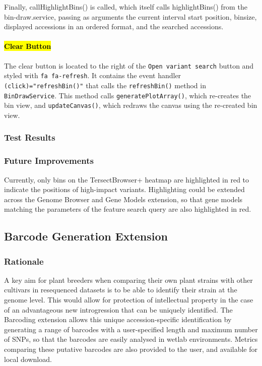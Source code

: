 \documentclass[12pt]{article}
\begin{document}
Finally, callHighlightBins() is called, which itself calls highlightBins() from the bin-draw.service, passing as arguments the current interval start position, binsize, displayed accessions in an ordered format, and the searched accessions.  

\paragraph{\hl{Clear Button }}
The clear button is located to the right of the \verb+Open variant search+ button and styled with \verb+fa fa-refresh+. It contains the event handler \verb+(click)="refreshBin()"+ that calls the \verb+refreshBin()+ method in \verb+BinDrawService+.
This method calls \verb+generatePlotArray()+, which re-creates the bin view, and \verb+updateCanvas()+, which redraws the canvas using the re-created bin view.
 

\subsubsection{Test Results}

\subsubsection{Future Improvements}
Currently, only bins on the TersectBrowser+ heatmap are highlighted in red to indicate the positions of high-impact variants. Highlighting could be extended across the Genome Browser and Gene Models extension, so that gene models matching the parameters of the feature search query are also highlighted in red.


\subsection{Barcode Generation Extension}
\subsubsection{Rationale}
A key aim for plant breeders when comparing their own plant strains with other cultivars in resequenced datasets is to be able to identify their strain at the genome level. This would allow for protection of intellectual property in the case of an advantageous new introgression that can be uniquely identified. The Barcoding extension allows this unique accession-specific identification by generating a range of barcodes with a user-specified length and maximum number of SNPs, so that the barcodes are easily analysed in wetlab environments. Metrics comparing these putative barcodes are also provided to the user, and available for local download. 
\end{document}
